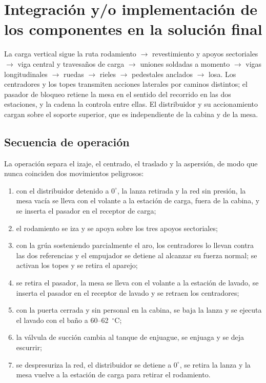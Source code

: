 \section{Integración y/o implementación de los componentes en la solución final}
\label{sec:integracion}

La carga vertical sigue la ruta rodamiento $\rightarrow$ revestimiento y apoyos sectoriales $\rightarrow$ viga central y travesaños de carga $\rightarrow$ uniones soldadas a momento $\rightarrow$ vigas longitudinales $\rightarrow$ ruedas $\rightarrow$ rieles $\rightarrow$ pedestales anclados $\rightarrow$ losa. Los centradores y los topes transmiten acciones laterales por caminos distintos; el pasador de bloqueo retiene la mesa en el sentido del recorrido en las dos estaciones, y la cadena la controla entre ellas. El distribuidor y su accionamiento cargan sobre el soporte superior, que es independiente de la cabina y de la mesa.

\subsection*{Secuencia de operación}

La operación separa el izaje, el centrado, el traslado y la aspersión, de modo que nunca coinciden dos movimientos peligrosos:
\begin{enumerate}
\item con el distribuidor detenido a $0^\circ$, la lanza retirada y la red sin presión, la mesa vacía se lleva con el volante a la estación de carga, fuera de la cabina, y se inserta el pasador en el receptor de carga;
\item el rodamiento se iza y se apoya sobre los tres apoyos sectoriales;
\item con la grúa sosteniendo parcialmente el aro, los centradores lo llevan contra las dos referencias y el empujador se detiene al alcanzar su fuerza normal; se activan los topes y se retira el aparejo;
\item se retira el pasador, la mesa se lleva con el volante a la estación de lavado, se inserta el pasador en el receptor de lavado y se retraen los centradores;
\item con la puerta cerrada y sin personal en la cabina, se baja la lanza y se ejecuta el lavado con el baño a 60--62~$^\circ$C;
\item la válvula de succión cambia al tanque de enjuague, se enjuaga y se deja escurrir;
\item se despresuriza la red, el distribuidor se detiene a $0^\circ$, se retira la lanza y la mesa vuelve a la estación de carga para retirar el rodamiento.
\end{enumerate}

